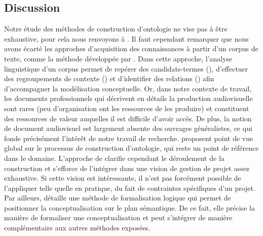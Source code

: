 





\subsection*{Discussion}



Notre étude des méthodes de construction d'ontologie ne vise pas à être exhaustive, pour cela nous renvoyons à \cite{Gomez-Perez2004}.
Il faut cependant remarquer que nous avons écarté les approches d'acquisition des connaissances à partir d'un corpus de texte, comme la méthode  développée par \cite{Aussenac-Gilles2003}.
Dans cette approche, l'analyse linguistique d'un corpus permet de repérer des candidats-termes (), d'effectuer des regroupements de contexte () et d'identifier des relations () afin d'accompagner la modélisation conceptuelle.
Or, dans notre contexte de travail, les documents professionnels qui décrivent en détails la production audiovisuelle sont rares (peu d'organisation ont les ressources de les produire) et constituent des ressources de valeur auquelles il est difficile d'avoir accès. 
De plus, la notion de document audiovisuel est largement absente des ouvrages généralistes, ce qui fonde précisément l'intérêt de notre travail de recherche.
\citeauthor{Uschold1996} proposent point de vue global sur le processus de construction d'ontologie, qui reste un point de référence dans le domaine.
L'approche de  clarifie cependant le déroulement de la construction et s'efforce de l'intégrer dans une vision de gestion de projet assez exhaustive. 
Si cette vision est intéressante, il n'est pas forcément possible de l'appliquer telle quelle en pratique, du fait de contraintes spécifiques d'un projet.
Par ailleurs,  détaille une méthode de formalisation logique qui permet de positionner la conceptualisation sur le plan sémantique. 
De ce fait, elle précise la manière de formaliser une conceptualisation et peut s'intégrer de manière complémentaire aux autres méthodes exposées.

